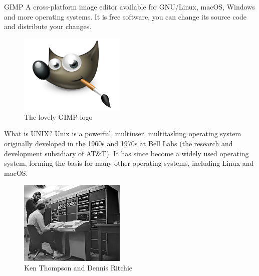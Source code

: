\documentclass{beamer}
\begin{document}
\begin{frame}{GIMP}
	A cross-platform image editor available for GNU/Linux, macOS, Windows and more operating 
	systems. It is free software, you can change its source code and distribute your changes. 
	\begin{figure}
		\begin{center}
			\includegraphics[width=0.45\textwidth]{images/gimp.png}
		\end{center}
		\caption{The lovely GIMP logo}
	\end{figure}
\end{frame}

\begin{frame}{What is UNIX?}
	Unix is a powerful, multiuser, multitasking operating system originally developed in 
	the 1960s and 1970s at Bell Labs (the research and development subsidiary of AT\&T).
	It has since become a widely used operating system, forming the basis for many other 
	operating systems, including Linux and macOS.
	\begin{figure}
		\begin{center}
			\includegraphics[width=0.45\textwidth]{images/unix.png}
		\end{center}
		\caption{Ken Thompson and Dennis Ritchie}
	\end{figure}
\end{frame}
\end{document}
